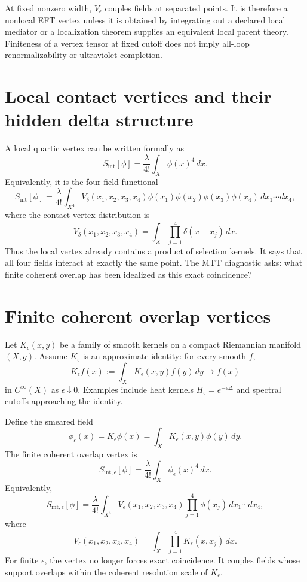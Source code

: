 \documentclass[11pt]{article}
\begin{document}
\begin{remark}
At fixed nonzero width, \(V_\epsilon\) couples fields at separated points.  It is therefore a
nonlocal EFT vertex unless it is obtained by integrating out a declared local mediator or a
localization theorem supplies an equivalent local parent theory.  Finiteness of a vertex
tensor at fixed cutoff does not imply all-loop renormalizability or ultraviolet completion.
\end{remark}

\section{Local contact vertices and their hidden delta structure}

A local quartic vertex can be written formally as
\[
S_{\mathrm{int}}[\phi]
=\frac{\lambda}{4!}\int_X \phi(x)^4\,dx .
\]
Equivalently, it is the four-field functional
\[
S_{\mathrm{int}}[\phi]
=
\frac{\lambda}{4!}
\int_{X^4}
V_{\delta}(x_1,x_2,x_3,x_4)
\phi(x_1)\phi(x_2)\phi(x_3)\phi(x_4)
\,dx_1\cdots dx_4,
\]
where the contact vertex distribution is
\[
V_{\delta}(x_1,x_2,x_3,x_4)
=
\int_X
\prod_{j=1}^{4}\delta(x-x_j)\,dx .
\]
Thus the local vertex already contains a product of selection kernels.  It says that all four
fields interact at exactly the same point.  The MTT diagnostic asks: what finite coherent
overlap has been idealized as this exact coincidence?

\section{Finite coherent overlap vertices}

Let \(K_\epsilon(x,y)\) be a family of smooth kernels on a compact Riemannian manifold
\((X,g)\).  Assume \(K_\epsilon\) is an approximate identity: for every smooth \(f\),
\[
K_\epsilon f(x):=\int_X K_\epsilon(x,y)f(y)\,dy\longrightarrow f(x)
\]
in \(C^\infty(X)\) as \(\epsilon\downarrow0\).  Examples include heat kernels
\(H_\epsilon=e^{-\epsilon\Delta}\) and spectral cutoffs approaching the identity.

Define the smeared field
\[
\phi_\epsilon(x)=K_\epsilon\phi(x)
=\int_XK_\epsilon(x,y)\phi(y)\,dy .
\]
The finite coherent overlap vertex is
\[
S_{\mathrm{int},\epsilon}[\phi]
=
\frac{\lambda}{4!}\int_X \phi_\epsilon(x)^4\,dx .
\]
Equivalently,
\[
S_{\mathrm{int},\epsilon}[\phi]
=
\frac{\lambda}{4!}
\int_{X^4}
V_\epsilon(x_1,x_2,x_3,x_4)
\prod_{j=1}^4\phi(x_j)\,
dx_1\cdots dx_4,
\]
where
\[
V_\epsilon(x_1,x_2,x_3,x_4)
=
\int_X\prod_{j=1}^{4}K_\epsilon(x,x_j)\,dx .
\]
For finite \(\epsilon\), the vertex no longer forces exact coincidence.  It couples fields
whose support overlaps within the coherent resolution scale of \(K_\epsilon\).
\end{document}
